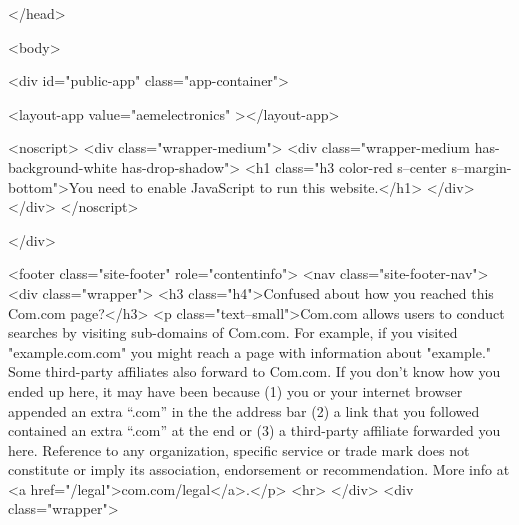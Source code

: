 </head>

<body>

<div id="public-app" class="app-container">

        
        <layout-app
        value="aemelectronics"
    ></layout-app>


        <noscript>
            <div class="wrapper-medium">
                <div class="wrapper-medium has-background-white has-drop-shadow">
                    <h1 class="h3 color-red s--center s--margin-bottom">You need to enable JavaScript to run this website.</h1>
                </div>
            </div>
        </noscript>

    </div>

    
        <footer class="site-footer" role="contentinfo">
    <nav class="site-footer-nav">
                    <div class="wrapper">
                <h3 class="h4">Confused about how you reached this Com.com page?</h3>
                <p class="text--small">Com.com allows users to conduct searches by visiting sub-domains of Com.com. For example, if you visited "example.com.com" you might reach a page with information about "example." Some third-party affiliates also forward to Com.com. If you don't know how you ended up here, it may have been because (1) you or your internet browser appended an extra “.com” in the the address bar (2) a link that you followed contained an extra “.com” at the end or (3) a third-party affiliate forwarded you here. Reference to any organization, specific service or trade mark does not constitute or imply its association, endorsement or recommendation. More info at <a href="/legal">com.com/legal</a>.</p>
                <hr>
            </div>
                <div class="wrapper">

